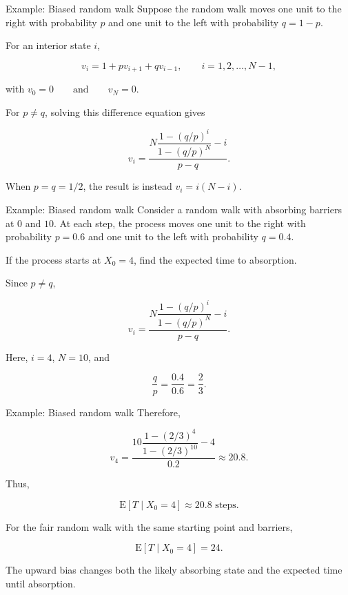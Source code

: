 \documentclass[
  ignorenonframetext,
  aspectratio=169,
]{beamer}
\begin{document}
\begin{frame}{Example: Biased random walk}
\protect{}\label{example-biased-random-walk-2}
Suppose the random walk moves one unit to the right with probability
\(p\) and one unit to the left with probability \(q=1-p\).

For an interior state \(i\),

\[
v_i=1+pv_{i+1}+qv_{i-1},
\qquad i=1,2,\ldots,N-1,
\]

with \(v_0=0 \qquad\text{and}\qquad v_N=0.\)

For \(p\ne q\), solving this difference equation gives

\[
\boxed{
v_i=
\frac{
N\dfrac{1-(q/p)^i}{1-(q/p)^N}-i
}{
p-q
}
}.
\]

When \(p=q=1/2\), the result is instead \(\boxed{v_i=i(N-i)}.\)
\end{frame}

\begin{frame}{Example: Biased random walk}
\protect{}\label{example-biased-random-walk-3}
Consider a random walk with absorbing barriers at \(0\) and \(10\). At
each step, the process moves one unit to the right with probability
\(p=0.6\) and one unit to the left with probability \(q=0.4\).

If the process starts at \(X_0=4\), find the expected time to
absorption.

Since \(p\ne q\),

\[
v_i=
\frac{
N\dfrac{1-(q/p)^i}{1-(q/p)^N}-i
}{
p-q
}.
\]

Here, \(i=4\), \(N=10\), and

\[
\frac{q}{p}=\frac{0.4}{0.6}=\frac23.
\]
\end{frame}

\begin{frame}{Example: Biased random walk}
\protect{}\label{example-biased-random-walk-4}
Therefore,

\[
v_4=
\frac{
10\dfrac{1-(2/3)^4}{1-(2/3)^{10}}-4
}{
0.2
}
\approx20.8.
\]

Thus,

\[
\boxed{\mathrm{E}[T\mid X_0=4]\approx20.8\text{ steps}}.
\]

For the fair random walk with the same starting point and barriers,

\[
\mathrm{E}[T\mid X_0=4]=24.
\]

The upward bias changes both the likely absorbing state and the expected
time until absorption.
\end{frame}
\end{document}
